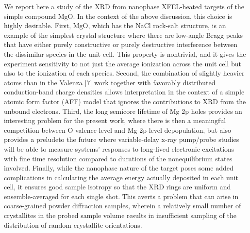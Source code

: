We report here a study of the XRD from nanophase XFEL-heated targets of
the simple compound MgO. In the context of the above discussion, this
choice is highly desirable. First, MgO, which has the NaCl rock-salt
structure, is an example of the simplest crystal structure where there
are low-angle Bragg peaks that have either purely constructive or purely
destructive interference between the dissimilar species in the unit
cell. This property is nontrivial, and it gives the experiment
sensitivity to not just the average ionization across the unit cell but
also to the ionization of each species. Second, the combination of
slightly heavier atoms than in the Valenza {[}7{]} work together with
favorably distributed conduction-band charge densities allows
interpretation in the context of a simple atomic form factor (AFF) model
that ignores the contributions to XRD from the unbound electrons. Third,
the long semicore lifetime of Mg 2p holes provides an interesting
problem for the present work, where there is then a meaningful
competition between O valence-level and Mg 2p-level depopulation, but
also provides a preludeto the future where variable-delay x-ray
pump/probe studies will be able to measure systems' responses to
long-lived electronic excitations with fine time resolution compared to
durations of the nonequilibrium states involved. Finally, while the
nanophase nature of the target poses some added complications in
calculating the average energy actually deposited in each unit cell, it
ensures good sample isotropy so that the XRD rings are uniform and
ensemble-averaged for each single shot. This averts a problem that can
arise in coarse-grained powder diffraction samples, wherein a relatively
small number of crystallites in the probed sample volume results in
insufficient sampling of the distribution of random crystallite
orientations.

